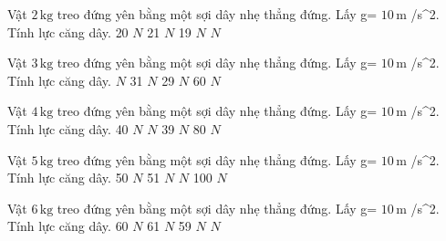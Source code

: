 \begin{ex}
Vật $2\,\text{kg}$ treo đứng yên bằng một sợi dây nhẹ thẳng đứng. Lấy g= $10\,\text{m}$ /s^2. Tính lực căng dây.
\choice
{20 $N$}
{21 $N$}
{19 $N$}
{ $N$}
\end{ex}

\begin{ex}
Vật $3\,\text{kg}$ treo đứng yên bằng một sợi dây nhẹ thẳng đứng. Lấy g= $10\,\text{m}$ /s^2. Tính lực căng dây.
\choice
{ $N$}
{31 $N$}
{29 $N$}
{60 $N$}
\end{ex}

\begin{ex}
Vật $4\,\text{kg}$ treo đứng yên bằng một sợi dây nhẹ thẳng đứng. Lấy g= $10\,\text{m}$ /s^2. Tính lực căng dây.
\choice
{40 $N$}
{ $N$}
{39 $N$}
{80 $N$}
\end{ex}

\begin{ex}
Vật $5\,\text{kg}$ treo đứng yên bằng một sợi dây nhẹ thẳng đứng. Lấy g= $10\,\text{m}$ /s^2. Tính lực căng dây.
\choice
{50 $N$}
{51 $N$}
{ $N$}
{100 $N$}
\end{ex}

\begin{ex}
Vật $6\,\text{kg}$ treo đứng yên bằng một sợi dây nhẹ thẳng đứng. Lấy g= $10\,\text{m}$ /s^2. Tính lực căng dây.
\choice
{60 $N$}
{61 $N$}
{59 $N$}
{ $N$}
\end{ex}


